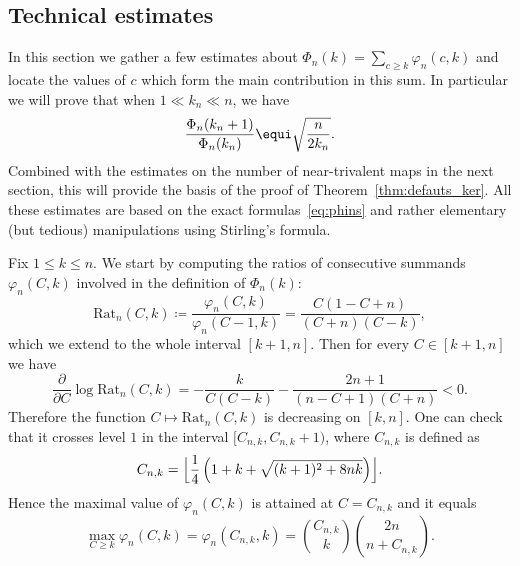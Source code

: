 \subsection{Technical estimates}

In this section we gather a few estimates about $\Phi_n(k) = \sum_{c \geq k} \varphi_{n}(c,k)$ and locate the values of $c$ which form the main contribution in this sum. In particular we will prove that when $1 \ll k_{n} \ll n$, we have
\begin{equation}\label{eq:ratioPhi1}
\frac{ \Phi_{n}(k_{n}+1)}{ \Phi_{n}(k_{n})} \equi \sqrt{ \frac{n}{2 k_{n}}}.
\end{equation}
Combined with the estimates on the number of near-trivalent maps in the next section, this will provide the basis of the proof of Theorem~\ref{thm:defauts_ker}. All these estimates are based on the exact formulas~\eqref{eq:phins} and rather elementary (but tedious) manipulations using Stirling's formula.

Fix $1 \leq k \leq n$. We start by computing the ratios of consecutive summands $\varphi_n(C,k)$ involved in the definition of $\Phi_n(k)$:
\begin{equation}\label{eq:def_Rat}
\mathrm{Rat}_{n}(C,k) \coloneqq \frac{\varphi_n(C,k)}{\varphi_n(C-1,k)} = \frac{C (1 - C + n)}{(C + n) (C - k)},
\end{equation}which we extend to the whole interval $[k+1,n]$.
Then for every $C \in [k+1,n]$ we have
\begin{equation}\label{eq:derivlog}
\frac{\partial}{\partial C} \log \mathrm{Rat}_n(C,k)
= - \frac{k}{C(C-k)}- \frac{2n+1}{(n-C+1)(C+n)}
< 0.
\end{equation}
Therefore the function $C \mapsto \mathrm{Rat}_n(C,k)$ is decreasing on $[k,n]$. One can check that it crosses level $1$ in the interval $[C_{n,k},C_{n,k}+1)$, where $C_{n,k}$ is defined as
\begin{equation}\label{eq:argmax_phi}
C_{n,k} = \Bigl\lfloor \frac{1}{4} \left(1+k + \sqrt{ (k+1)^{2} + 8 n k } \right) \Bigr\rfloor.
\end{equation}
Hence the maximal value of $\varphi_n(C,k)$ is attained at $C=C_{n,k}$ and it equals
\[
\max_{C \ge k} \varphi_n(C,k) = \varphi_n(C_{n,k},k) = \binom{C_{n,k}}{k} \binom{2n}{n+C_{n,k}}.
\]

